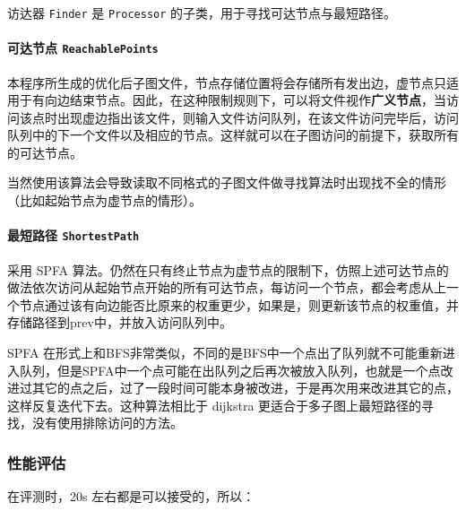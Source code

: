 \documentclass[
]{article}
\begin{document}
访达器 \texttt{Finder} 是 \texttt{Processor}
的子类，用于寻找可达节点与最短路径。

\hypertarget{header-n208}{%
\paragraph{\texorpdfstring{可达节点
\texttt{ReachablePoints}}{可达节点 ReachablePoints}}\label{header-n208}}

本程序所生成的优化后子图文件，节点存储位置将会存储所有发出边，虚节点只适用于有向边结束节点。因此，在这种限制规则下，可以将文件视作\textbf{广义节点}，当访问该点时出现虚边指出该文件，则输入文件访问队列，在该文件访问完毕后，访问队列中的下一个文件以及相应的节点。这样就可以在子图访问的前提下，获取所有的可达节点。

当然使用该算法会导致读取不同格式的子图文件做寻找算法时出现找不全的情形（比如起始节点为虚节点的情形）。

\hypertarget{header-n211}{%
\paragraph{\texorpdfstring{最短路径
\texttt{ShortestPath}}{最短路径 ShortestPath}}\label{header-n211}}

采用 SPFA
算法。仍然在只有终止节点为虚节点的限制下，仿照上述可达节点的做法依次访问从起始节点开始的所有可达节点，每访问一个节点，都会考虑从上一个节点通过该有向边能否比原来的权重更少，如果是，则更新该节点的权重值，并存储路径到prev中，并放入访问队列中。

SPFA
在形式上和BFS非常类似，不同的是BFS中一个点出了队列就不可能重新进入队列，但是SPFA中一个点可能在出队列之后再次被放入队列，也就是一个点改进过其它的点之后，过了一段时间可能本身被改进，于是再次用来改进其它的点，这样反复迭代下去。这种算法相比于
dijkstra 更适合于多子图上最短路径的寻找，没有使用排除访问的方法。

\hypertarget{header-n214}{%
\subsubsection{性能评估}\label{header-n214}}

在评测时，20s 左右都是可以接受的，所以：
\end{document}
